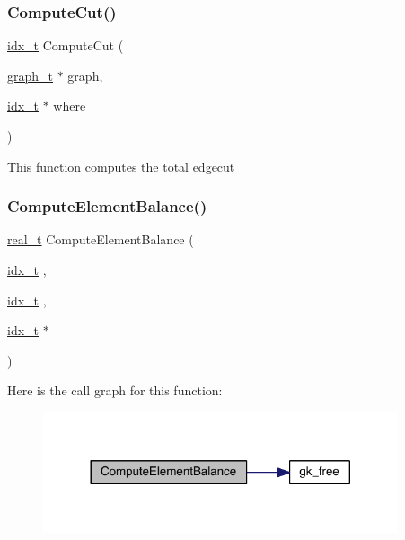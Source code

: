 \subsubsection{\texorpdfstring{Compute\+Cut()}{ComputeCut()}}
{\footnotesize\ttfamily \hyperlink{a00876_aaa5262be3e700770163401acb0150f52}{idx\+\_\+t} Compute\+Cut (\begin{DoxyParamCaption}\item[{\hyperlink{a00734}{graph\+\_\+t} $\ast$}]{graph,  }\item[{\hyperlink{a00876_aaa5262be3e700770163401acb0150f52}{idx\+\_\+t} $\ast$}]{where }\end{DoxyParamCaption})}

This function computes the total edgecut \mbox{\label{a00945_ae5047d01aa0d4829e201bcb1e47eaef0}} 
\subsubsection{\texorpdfstring{Compute\+Element\+Balance()}{ComputeElementBalance()}}
{\footnotesize\ttfamily \hyperlink{a00876_a1924a4f6907cc3833213aba1f07fcbe9}{real\+\_\+t} Compute\+Element\+Balance (\begin{DoxyParamCaption}\item[{\hyperlink{a00876_aaa5262be3e700770163401acb0150f52}{idx\+\_\+t}}]{,  }\item[{\hyperlink{a00876_aaa5262be3e700770163401acb0150f52}{idx\+\_\+t}}]{,  }\item[{\hyperlink{a00876_aaa5262be3e700770163401acb0150f52}{idx\+\_\+t} $\ast$}]{ }\end{DoxyParamCaption})}

Here is the call graph for this function\+:\nopagebreak
\begin{figure}[H]
\begin{center}
\leavevmode
\includegraphics[width=296pt]{a00945_ae5047d01aa0d4829e201bcb1e47eaef0_cgraph}
\end{center}
\end{figure}
\mbox{\label{a00945_aa23b4d433fc175282f237653d3edb8a5}} 
